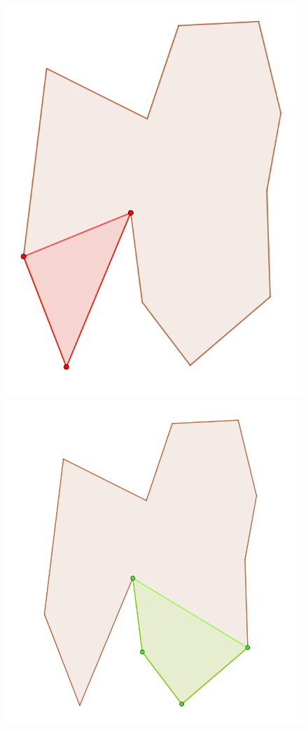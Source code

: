 \documentclass[12pt]{article}
\begin{document}
\begin{figure}[H]
    \includegraphics[width=\linewidth]{Images/intersection_yMonotoneSection1.png}
    \caption{}
    \label{fig:intersectionPolygonSection1}
    \endminipage\hfill
    \includegraphics[width=\linewidth]{Images/intersection_yMonotoneSection2.png}

\end{figure}
\end{document}
